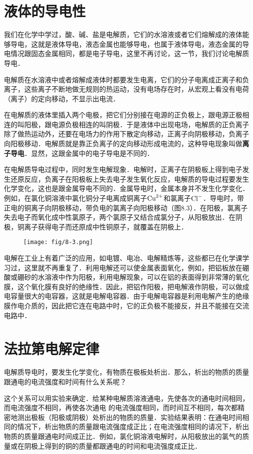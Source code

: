 \section{液体的导电性}
我们在化学中学过，酸、碱、盐是电解质，它们的水溶液或者它们熔解成的液体能够导电，这就是液体导电，液态金属也能够导电，也属于液体导电，液态金属的导电情况跟固态金属相同，都是电子导电，这里不再讨论，这一节，我们讨论电解质导电．

电解质在水溶液中或者熔解成液体时都要发生电离，它们的分子电离成正离子和负离子，这些离子不断地做无规则的热运动，没有电场存在时，从宏观上看没有电荷（离子）的定向移动，不显示出电流．

在电解质的液体里插入两个电极，把它们分别接在电源的正负极上，跟电源正极相连的叫阳极，跟电源负极相连的叫阴极．于是液体中出现电场，电解质的正负离子除了做热运动外，还要在电场力的作用下散定向移动，正离子向阴极移动，负离子向阳极移动．电解质就是靠正负离子的定向移动形成电流的，这种导电现象叫做\textbf{离子导电}．显然，这跟金属中的电子导电是不同的．

在电解质导电过程中，同时发生电解现象．电解时，正离子在阴极板上得到电子发生还原反应，负离子在阳极板上失去电子发生氧化反应，电解质的导电过程要发生化学变化，这也是跟金属导电不同的．金属导电时，金属本身并不发生化学变化．例如，在氯化铜溶液中氯化铜分子电离成铜离子${\rm Cu}^{2+}$和氯离子${\rm Cl}^-$．导电时，带正电的铜离子向阴极移动，带负电的氯离子向阳极移动（图8.3）．在阳极，氯离子失去电子而氧化成中性氯原子，两个氯原子又结合成氯分子，从阳极放出．在阴极，铜离子获得电子而还原成中性铜原子，就覆盖在阴极上．
\begin{figure}[htp]\centering
    \texttt{[image: fig/8-3.png]}
    \caption{}
    \end{figure}

电解在工业上有着广泛的应用，如电镀、电冶、电解精炼等，这些都已在化学课学习过，这里就不再重复了．利用电解还可以使金属表面氧化，例如，把铝板放在硼酸或硼砂的水溶液中作为阳极，利用电解现象，可以在铝的表面得到非常薄的氧化膜，这个氧化膜有良好的绝缘性．因此，把铝作阳极，把电解液作阴极，可以做成电容量很大的电容器，这就是电解电容器．由于电解电容器是利用电解产生的绝缘膜作电介质的，因此把它连在电路中时，它的正负极不能接反，并且不能接在交流电路中．

\section{法拉第电解定律}
电解质导电时，要发生化学变化，有物质在极板处析出．那么，析出的物质的质量跟通电的电流强度和时间有什么关系呢？

这个关系可以用实验来确定．给某种电解质溶液通电，先使各次的通电时间相同，而电流强度不相同，再使各次通电
的电流强度相同，而时间互不相同，每次都精密地测出极板（阳极或阴极）处析出的物质的质量．实验结果表明：在通电时间相同的情况下，析出物质的质量跟电流强度成正比；在电流强度相同的请况下，析出物质的质量跟通电时间成正比．例如，氯化铜溶液电解时，从阳极放出的氯气的质量或在阴极上得到的铜的质量都跟通电的时间和电流强度成正比．

